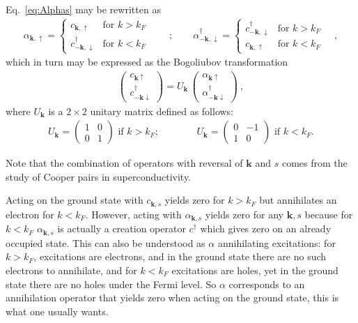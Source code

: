 \documentclass[11pt,a4paper]{article}
\newcommand{\boldk}{{\boldsymbol k}}
\begin{document}
\begin{loesung}
\begin{exenumerate}
  \item Eq.~\eqref{eq:Alphas} may be rewritten as
    \begin{align}
      \alpha_{\boldk,\uparrow} =
      \begin{cases} c_{\boldk,\uparrow} & \text{for $k>k_F$} \\
        c_{-\boldk,\downarrow}^\dagger & \text{for $k<k_F$} \end{cases}
      \qquad ; \qquad
      \alpha_{-\boldk,\downarrow}^\dagger =
      \begin{cases} c^\dagger_{-\boldk,\downarrow} & \text{for $k>k_F$} \\
        c_{\boldk,\uparrow} & \text{for $k<k_F$} \end{cases}
      \quad ,
    \end{align}
    which in turn may be expressed as the Bogoliubov transformation
    \begin{align}
      \begin{pmatrix} c_{\boldk\uparrow} \\ c_{-\boldk\downarrow}^\dagger \end{pmatrix}
      = U_\boldk\,
      \begin{pmatrix} \alpha_{\boldk\uparrow} \\ \alpha_{-\boldk\downarrow}^\dagger \end{pmatrix}\ ,
    \end{align}
    where $U_\boldk$ is a $2\times2$ unitary matrix defined as follows:
    \begin{align}
      U_\boldk = \begin{pmatrix} 1 & 0\\ 0 & 1\end{pmatrix}\text{ if $k>k_F$;} \qquad\qquad
      U_\boldk = \begin{pmatrix} 0 & -1\\ 1 & 0\end{pmatrix}\text{ if $k<k_F$.}
    \end{align}

    Note that the combination of operators with reversal of $\boldk$ and $s$ comes from the study of
    Cooper pairs in superconductivity.

    Acting on the ground state with $c_{\boldk,s}$ yields zero for $k>k_F$ but annihilates an electron
    for $k<k_F$. However, acting with $\alpha_{\boldk,s}$ yields zero for any $\boldk,s$ because for $k<k_F$
    $\alpha_{\boldk,s}$ is actually a creation operator $c^\dagger$ which gives zero on an already occupied
    state. This can also be understood as $\alpha$ annihilating excitations: for $k>k_F$, excitations are
    electrons, and in the ground state there are no such electrons to annihilate, and for $k<k_F$ excitations
    are holes, yet in the ground state there are no holes under the Fermi level. So $\alpha$ corresponds
    to an annihilation operator that yields zero when acting on the ground state, this is what one usually
    wants.
    

\end{exenumerate}
\end{loesung}
\end{document}
